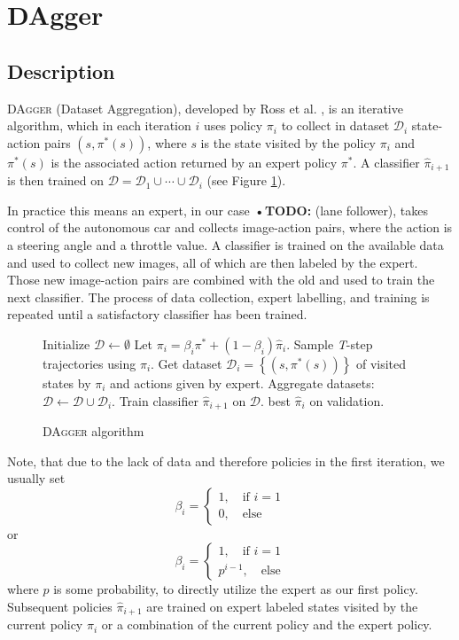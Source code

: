 \documentclass[conference]{IEEEtran}
\begin{document}
\section{DAgger}

\subsection{Description}

DA\textsc{gger} (Dataset Aggregation), developed by Ross et al. \cite{Ross2011}, is an iterative algorithm, which in each iteration \( i \) uses policy \( \pi_i \) to collect in dataset \( \mathcal{D}_i \) state-action pairs \( (s,\pi^*(s)) \), where \( s \) is the state visited by the policy \( \pi_i \) and \( \pi^*(s) \) is the associated action returned by an expert policy \( \pi^* \). A classifier \( \hat{ \pi}_{i+1} \) is then trained on \( \mathcal{D} = \mathcal{D}_1 \cup \dotsm \cup \mathcal{D}_i \) (see Figure \ref{fig:dagger}).

In practice this means an expert, in our case \textbf{•TODO:} (lane follower), takes control of the autonomous car and collects image-action pairs, where the action is a steering angle and a throttle value. A classifier is trained on the available data and used to collect new images, all of which are then labeled by the expert. Those new image-action pairs are combined with the old and used to train the next classifier. The process of data collection, expert labelling, and training is repeated until a satisfactory classifier has been trained.

\begin{figure}[h]
\begin{algorithmic}[1]
\STATE Initialize \(\mathcal{D}\gets \emptyset\)
\STATE Let \( \pi_i = \beta_i \pi^* + \left( 1- \beta_i\right)\hat{ \pi}_i \).
\STATE Sample \textit{T}-step trajectories using \( \pi_i \).
\STATE Get dataset \( \mathcal{D}_i = \left\{ \left( s, \pi^*(s)\right)\right\} \) of visited states by \( \pi_i \) and actions given by expert.
\STATE Aggregate datasets: \( \mathcal{D}\gets \mathcal{D} \cup \mathcal{D}_i \).
\STATE Train classifier \( \hat{ \pi}_{i+1} \) on \( \mathcal{D} \).
\ENDFOR
\RETURN best \( \hat{ \pi}_i \) on validation.
\end{algorithmic}
\caption{DA\textsc{gger} algorithm}
\label{fig:dagger}
\end{figure}

Note, that due to the lack of data and therefore policies in the first iteration, we usually set
\[
\beta_i = \begin{cases}
1,\quad\text{if }i=1\\
0,\quad\text{else}
\end{cases}
\]
or
\[
\beta_i = \begin{cases}
1,\quad\text{if }i=1\\
p^{i-1},\quad\text{else}
\end{cases}
\]
where \( p \) is some probability, to directly utilize the expert as our first policy. Subsequent policies \( \hat{ \pi}_{i+1} \) are trained on expert labeled states visited by the current policy \( \pi_i \) or a combination of the current policy and the expert policy.
\end{document}
